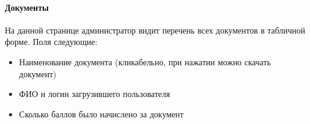 \documentclass[DIV=calc, paper=a4, fontsize=11pt]{scrartcl} %
\begin{document}
\paragraph{Документы}

На данной странице администратор видит перечень всех документов в табличной форме. Поля следующие:

\begin{itemize}
	\item Наименование документа (кликабельно, при нажатии можно скачать документ)
	\item ФИО и логин загрузившего пользователя
	\item Сколько баллов было начислено за документ
\end{itemize}
\end{document}
